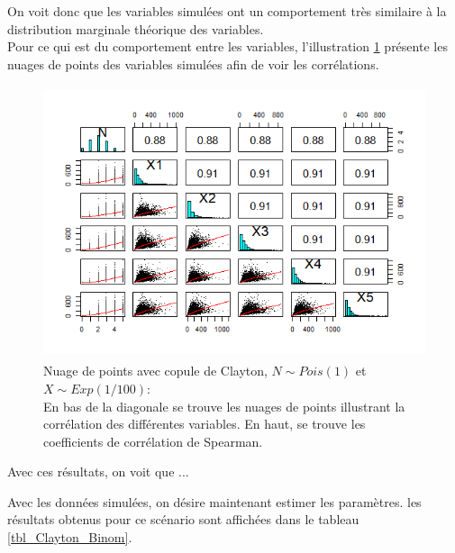 \documentclass{article}
\begin{document}
	On voit donc que les variables simulées ont un comportement très similaire à la distribution marginale théorique des variables.\\
	
	Pour ce qui est du comportement entre les variables, l'illustration \ref{gaph_scatterplot_Binom} présente les nuages de points des variables simulées afin de voir les corrélations.
	
	\begin{figure}[H]
		\centering
		\includegraphics[height=8cm]{Graph/scatterplot_Binom.png}
		\caption[Nuage de points avec copule de Clayton, $N\sim Pois(1)$ et $X\sim Exp(1/100)$]{Nuage de points avec copule de Clayton, $N\sim Pois(1)$ et $X\sim Exp(1/100)$: \\
			En bas de la diagonale se trouve les nuages de points illustrant la corrélation des différentes variables. En haut, se trouve les coefficients de corrélation de Spearman.} 
		\label{gaph_scatterplot_Binom}
	\end{figure}
	

	
	Avec ces résultats, on voit que ...
	
	
	
	
	Avec les données simulées, on désire maintenant estimer les paramètres. 
	les résultats obtenus pour ce scénario sont affichées dans le tableau \ref{tbl_Clayton_Binom}.
	
\end{document}
